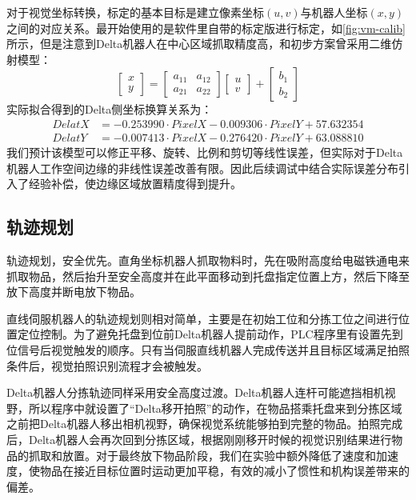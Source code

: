 \documentclass[UTF8,a4paper,12pt,fontset=windows]{ctexart}
\begin{document}
对于视觉坐标转换，标定的基本目标是建立像素坐标$(u,v)$与机器人坐标$(x,y)$之间的对应关系。最开始使用的是软件里自带的标定版进行标定，如\ref{fig:vm-calib}所示，但是注意到Delta机器人在中心区域抓取精度高，和初步方案曾采用二维仿射模型：
\[
\begin{bmatrix}
x\\
y
\end{bmatrix}
=
\begin{bmatrix}
a_{11} & a_{12}\\
a_{21} & a_{22}
\end{bmatrix}
\begin{bmatrix}
u\\
v
\end{bmatrix}
+
\begin{bmatrix}
b_1\\
b_2
\end{bmatrix}
\label{biaoding}
\]
实际拟合得到的Delta侧坐标换算关系为：
\[
\begin{aligned}
DelatX &= -0.253990 \cdot PixelX - 0.009306 \cdot PixelY + 57.632354\\
DelatY &= -0.007413 \cdot PixelX - 0.276420 \cdot PixelY + 63.088810
\end{aligned}
\]
我们预计该模型可以修正平移、旋转、比例和剪切等线性误差，但实际对于Delta机器人工作空间边缘的非线性误差改善有限。因此后续调试中结合实际误差分布引入了经验补偿，使边缘区域放置精度得到提升。

\subsection{轨迹规划}

轨迹规划，安全优先。直角坐标机器人抓取物料时，先在吸附高度给电磁铁通电来抓取物品，然后抬升至安全高度并在此平面移动到托盘指定位置上方，然后下降至放下高度并断电放下物品。

直线伺服机器人的轨迹规划则相对简单，主要是在初始工位和分拣工位之间进行位置定位控制。为了避免托盘到位前Delta机器人提前动作，PLC程序里有设置先到位信号后视觉触发的顺序。只有当伺服直线机器人完成传送并且目标区域满足拍照条件后，视觉拍照识别流程才会被触发。

Delta机器人分拣轨迹同样采用安全高度过渡。Delta机器人连杆可能遮挡相机视野，所以程序中就设置了“Delta移开拍照”的动作，在物品搭乘托盘来到分拣区域之前把Delta机器人移出相机视野，确保视觉系统能够拍到完整的物品。拍照完成后，Delta机器人会再次回到分拣区域，根据刚刚移开时候的视觉识别结果进行物品的抓取和放置。对于最终放下物品阶段，我们在实验中额外降低了速度和加速度，使物品在接近目标位置时运动更加平稳，有效的减小了惯性和机构误差带来的偏差。
\end{document}
